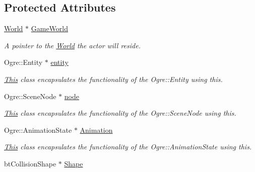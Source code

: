 \subsection*{Protected Attributes}
\begin{DoxyCompactItemize}
\item 
\hypertarget{classphys_1_1ActorBase_a0ffbb74296ac96db26c890274df794a2}{
\hyperlink{classphys_1_1World}{World} $\ast$ \hyperlink{classphys_1_1ActorBase_a0ffbb74296ac96db26c890274df794a2}{GameWorld}}
\label{d8/d0f/classphys_1_1ActorBase_a0ffbb74296ac96db26c890274df794a2}

\begin{DoxyCompactList}\small\item\em A pointer to the \hyperlink{classphys_1_1World}{World} the actor will reside. \item\end{DoxyCompactList}\item 
\hypertarget{classphys_1_1ActorBase_ae44969ba242ca5c13a608b7467be0674}{
Ogre::Entity $\ast$ \hyperlink{classphys_1_1ActorBase_ae44969ba242ca5c13a608b7467be0674}{entity}}
\label{d8/d0f/classphys_1_1ActorBase_ae44969ba242ca5c13a608b7467be0674}

\begin{DoxyCompactList}\small\item\em \hyperlink{structThis}{This} class encapsulates the functionality of the Ogre::Entity using this. \item\end{DoxyCompactList}\item 
\hypertarget{classphys_1_1ActorBase_a687bfa0cc44adf715651c7ac41a46321}{
Ogre::SceneNode $\ast$ \hyperlink{classphys_1_1ActorBase_a687bfa0cc44adf715651c7ac41a46321}{node}}
\label{d8/d0f/classphys_1_1ActorBase_a687bfa0cc44adf715651c7ac41a46321}

\begin{DoxyCompactList}\small\item\em \hyperlink{structThis}{This} class encapsulates the functionality of the Ogre::SceneNode using this. \item\end{DoxyCompactList}\item 
\hypertarget{classphys_1_1ActorBase_aed2853b0a97e12aa73f6167aa572e5f3}{
Ogre::AnimationState $\ast$ \hyperlink{classphys_1_1ActorBase_aed2853b0a97e12aa73f6167aa572e5f3}{Animation}}
\label{d8/d0f/classphys_1_1ActorBase_aed2853b0a97e12aa73f6167aa572e5f3}

\begin{DoxyCompactList}\small\item\em \hyperlink{structThis}{This} class encapsulates the functionality of the Ogre::AnimationState using this. \item\end{DoxyCompactList}\item 
\hypertarget{classphys_1_1ActorBase_a643613ce7abb4b6d4352bab036b7cf69}{
btCollisionShape $\ast$ \hyperlink{classphys_1_1ActorBase_a643613ce7abb4b6d4352bab036b7cf69}{Shape}}
\label{d8/d0f/classphys_1_1ActorBase_a643613ce7abb4b6d4352bab036b7cf69}


\end{DoxyCompactItemize}
